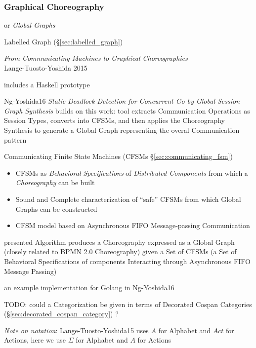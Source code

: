 \subsubsection{Graphical Choreography}\label{sec:graphical_choreography}

or \emph{Global Graphs}

\fist Labelled Graph (\S\ref{sec:labelled_graph})

\begingroup

\newcommand{\party}{\mono}

\emph{From Communicating Machines to Graphical Choreographies} \\
Lange-Tuosto-Yoshida 2015

includes a Haskell prototype

Ng-Yoshida16 \emph{Static Deadlock Detection for Concurrent Go by
  Global Session Graph Synthesis} builds on this work: tool extracts
Communication Operations as Session Types, converts into CFSMs, and
then applies the Choreography Synthesis to generate a Global Graph
representing the overal Communication pattern

\fist Communicating Finite State Machines (CFSMs
\S\ref{sec:communicating_fsm})

\begin{itemize}
\item CFSMs as \emph{Behavioral Specifications} of \emph{Distributed
  Components} from which a \emph{Choreography} can be built
\item Sound and Complete characterization of ``safe'' CFSMs from which
  Global Graphs can be constructed
\item CFSM model based on Asynchronous FIFO Message-passing
  Communication
\end{itemize}

presented Algorithm produces a Choreography expressed as a Global Graph
(closely related to BPMN 2.0 Choreography) given a Set of CFSMs (a Set
of Behavioral Specifications of components Interacting through
Asynchronous FIFO Message Passing)

\fist an example implementation for Golang in Ng-Yoshida16

TODO: could a Categorization be given in terms of Decorated Cospan
Categories (\S\ref{sec:decorated_cospan_category}) ?

\asterism

\emph{Note on notation}: Lange-Tuosto-Yoshida15 uses $A$ for
Alphabet and $Act$ for Actions, here we use $\Sigma$ for Alphabet and
$A$ for Actions

